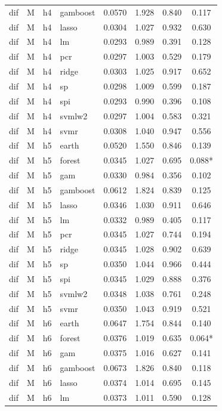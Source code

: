 \begin{ThreePartTable}
\begin{longtable}[t]{llclcccc}
dif & M & h4 & gamboost & 0.0570 & 1.928 & 0.840 & 0.117\\
dif & M & h4 & lasso & 0.0304 & 1.027 & 0.932 & 0.630\\
dif & M & h4 & lm & 0.0293 & 0.989 & 0.391 & 0.128\\
dif & M & h4 & pcr & 0.0297 & 1.003 & 0.529 & 0.179\\
dif & M & h4 & ridge & 0.0303 & 1.025 & 0.917 & 0.652\\
dif & M & h4 & sp & 0.0298 & 1.009 & 0.599 & 0.187\\
dif & M & h4 & spi & 0.0293 & 0.990 & 0.396 & 0.108\\
dif & M & h4 & svmlw2 & 0.0297 & 1.004 & 0.583 & 0.321\\
dif & M & h4 & svmr & 0.0308 & 1.040 & 0.947 & 0.556\\
\addlinespace
dif & M & h5 & earth & 0.0520 & 1.550 & 0.846 & 0.139\\
dif & M & h5 & forest & 0.0345 & 1.027 & 0.695 & 0.088*\\
dif & M & h5 & gam & 0.0330 & 0.984 & 0.356 & 0.102\\
dif & M & h5 & gamboost & 0.0612 & 1.824 & 0.839 & 0.125\\
dif & M & h5 & lasso & 0.0346 & 1.030 & 0.911 & 0.646\\
dif & M & h5 & lm & 0.0332 & 0.989 & 0.405 & 0.117\\
dif & M & h5 & pcr & 0.0345 & 1.027 & 0.744 & 0.194\\
dif & M & h5 & ridge & 0.0345 & 1.028 & 0.902 & 0.639\\
dif & M & h5 & sp & 0.0350 & 1.044 & 0.966 & 0.444\\
dif & M & h5 & spi & 0.0345 & 1.029 & 0.888 & 0.376\\
dif & M & h5 & svmlw2 & 0.0348 & 1.038 & 0.761 & 0.248\\
dif & M & h5 & svmr & 0.0350 & 1.043 & 0.919 & 0.521\\
\addlinespace
dif & M & h6 & earth & 0.0647 & 1.754 & 0.844 & 0.140\\
dif & M & h6 & forest & 0.0376 & 1.019 & 0.635 & 0.064*\\
dif & M & h6 & gam & 0.0375 & 1.016 & 0.627 & 0.141\\
dif & M & h6 & gamboost & 0.0673 & 1.826 & 0.840 & 0.118\\
dif & M & h6 & lasso & 0.0374 & 1.014 & 0.695 & 0.145\\
dif & M & h6 & lm & 0.0373 & 1.011 & 0.590 & 0.128\\

\end{longtable}
\end{ThreePartTable}

